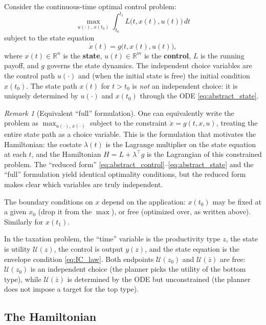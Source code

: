\documentclass[12pt,a4paper]{article}
\theoremstyle{definition}
\theoremstyle{plain}
\theoremstyle{remark}
\newtheorem{remark}{Remark}[section]
\newcommand{\R}{\mathbb{R}}
\newcommand{\zbar}{\bar{z}}
\newcommand{\zlow}{z_{\scriptscriptstyle 0}}
\newcommand{\calU}{\mathcal{U}}
\begin{document}
Consider the continuous-time optimal control problem:
\begin{equation}
\label{eq:abstract_control}
  \max_{u(\cdot),\, x(t_0)} \int_{t_0}^{t_1} L\bigl(t, x(t), u(t)\bigr)\, dt
\end{equation}
subject to the state equation
\begin{equation}
\label{eq:abstract_state}
  \dot{x}(t) = g\bigl(t, x(t), u(t)\bigr),
\end{equation}
where $x(t) \in \R^n$ is the \textbf{state}, $u(t) \in \R^m$ is the \textbf{control}, $L$ is the running payoff, and $g$ governs the state dynamics. The independent choice variables are the control path $u(\cdot)$ and (when the initial state is free) the initial condition $x(t_0)$. The state path $x(t)$ for $t > t_0$ is \emph{not} an independent choice: it is uniquely determined by $u(\cdot)$ and $x(t_0)$ through the ODE \eqref{eq:abstract_state}.

\begin{remark}[Equivalent ``full'' formulation]
\label{rem:full_formulation}
One can equivalently write the problem as $\max_{u(\cdot),\, x(\cdot)}$ subject to the constraint $\dot{x} = g(t,x,u)$, treating the entire state path as a choice variable. This is the formulation that motivates the Hamiltonian: the costate $\lambda(t)$ is the Lagrange multiplier on the state equation at each $t$, and the Hamiltonian $H = L + \lambda^\top g$ is the Lagrangian of this constrained problem. The ``reduced form'' \eqref{eq:abstract_control}--\eqref{eq:abstract_state} and the ``full'' formulation yield identical optimality conditions, but the reduced form makes clear which variables are truly independent.
\end{remark}

The boundary conditions on $x$ depend on the application: $x(t_0)$ may be fixed at a given $x_0$ (drop it from the $\max$), or free (optimized over, as written above). Similarly for $x(t_1)$.

In the taxation problem, the ``time'' variable is the productivity type $z$, the state is utility $\calU(z)$, the control is output $y(z)$, and the state equation is the envelope condition \eqref{eq:IC_law}. Both endpoints $\calU(\zlow)$ and $\calU(\zbar)$ are free: $\calU(\zlow)$ is an independent choice (the planner picks the utility of the bottom type), while $\calU(\zbar)$ is determined by the ODE but unconstrained (the planner does not impose a target for the top type).

\subsection{The Hamiltonian}
\end{document}
